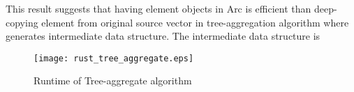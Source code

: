 This result suggests that having element objects in Arc is efficient than deep-copying element from original source vector in tree-aggregation algorithm 
where generates intermediate data structure. The intermediate data structure is 

\begin{figure}[htb]
    \texttt{[image: rust\_tree\_aggregate.eps]}
    \caption{Runtime of Tree-aggregate algorithm}
    \label{fig:Sampling}
\end{figure}
